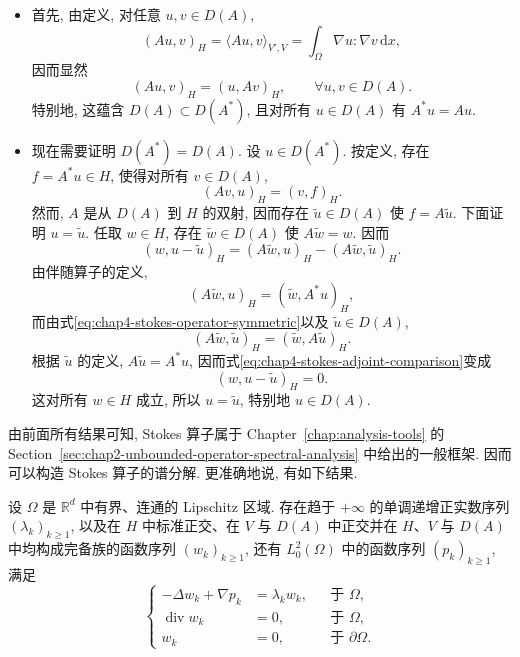 \begin{Proof}
\begin{itemize}
 \item 首先, 由定义, 对任意 $u,v\in D(A)$,
 \[
  (Au,v)_H=\langle Au,v\rangle_{V',V}
  =\int_\Omega\nabla u:\nabla v\,\mathrm dx,
 \]
 因而显然
 \begin{equation}
  (Au,v)_H=(u,Av)_H,
  \qquad\forall u,v\in D(A).
  \label{eq:chap4-stokes-operator-symmetric}
 \end{equation}
 特别地, 这蕴含 $D(A)\subset D(A^*)$, 且对所有 $u\in D(A)$ 有 $A^*u=Au$.

 \item 现在需要证明 $D(A^*)=D(A)$. 设 $u\in D(A^*)$. 按定义, 存在 $f=A^*u\in H$, 使得对所有 $v\in D(A)$,
 \[
  (Av,u)_H=(v,f)_H.
 \]
 然而, $A$ 是从 $D(A)$ 到 $H$ 的双射, 因而存在 $\widetilde u\in D(A)$ 使 $f=A\widetilde u$. 下面证明 $u=\widetilde u$. 任取 $w\in H$, 存在 $\widetilde w\in D(A)$ 使 $A\widetilde w=w$. 因而
 \begin{equation}
  (w,u-\widetilde u)_H=(A\widetilde w,u)_H-(A\widetilde w,\widetilde u)_H.
  \label{eq:chap4-stokes-adjoint-comparison}
 \end{equation}
 由伴随算子的定义,
 \[
  (A\widetilde w,u)_H=(\widetilde w,A^*u)_H,
 \]
 而由式\eqref{eq:chap4-stokes-operator-symmetric}以及 $\widetilde u\in D(A)$,
 \[
  (A\widetilde w,\widetilde u)_H=(\widetilde w,A\widetilde u)_H.
 \]
 根据 $\widetilde u$ 的定义, $A\widetilde u=A^*u$, 因而式\eqref{eq:chap4-stokes-adjoint-comparison}变成
 \[
  (w,u-\widetilde u)_H=0.
 \]
 这对所有 $w\in H$ 成立, 所以 $u=\widetilde u$, 特别地 $u\in D(A)$.
\end{itemize}
\end{Proof}

由前面所有结果可知, Stokes 算子属于 Chapter~\ref{chap:analysis-tools} 的 Section~\ref{sec:chap2-unbounded-operator-spectral-analysis} 中给出的一般框架. 因而可以构造 Stokes 算子的谱分解. 更准确地说, 有如下结果.

\begin{Theorem}
\label{thm:chap4-stokes-spectral-decomposition}
设 $\Omega$ 是 $\mathbb R^d$ 中有界、连通的 Lipschitz 区域. 存在趋于 $+\infty$ 的单调递增正实数序列 $(\lambda_k)_{k\geq1}$, 以及在 $H$ 中标准正交、在 $V$ 与 $D(A)$ 中正交并在 $H$、$V$ 与 $D(A)$ 中均构成完备族的函数序列 $(w_k)_{k\geq1}$, 还有 $L_0^2(\Omega)$ 中的函数序列 $(p_k)_{k\geq1}$, 满足
\begin{equation}
 \left\{
 \begin{aligned}
  -\Delta w_k+\nabla p_k&=\lambda_kw_k,&&\text{于 }\Omega,\\
  \operatorname{div}w_k&=0,&&\text{于 }\Omega,\\
  w_k&=0,&&\text{于 }\partial\Omega.
 \end{aligned}
 \right.
 \label{eq:chap4-stokes-eigenproblem}
\end{equation}
\end{Theorem}

